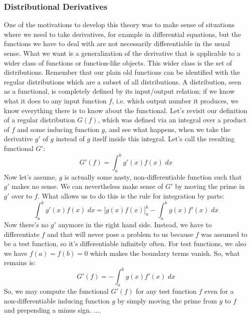 \subsubsection{Distributional Derivatives}
One of the motivations to develop this theory was to make sense of situations where we need to take derivatives, for example in differential equations, but the functions we have to deal with are not necessarily differentiable in the usual sense. What we want is a generalization of the derivative that is applicable to a wider class of functions or function-like objects. This wider class is the set of distributions. Remember that our plain old functions can be identified with the regular distributions which are a subset of all distributions. A distribution, seen as a functional, is completely defined by its input/output relation: if we know what it does to any input function $f$, i.e. which output number it produces, we know everything there is to know about the functional. Let's revisit our definition of a regular distribution $G(f)$, which was defined via an integral over a product of $f$ and some inducing function $g$, and see what happens, when we take the derivative $g'$ of $g$ instead of $g$ itself inside this integral. Let's call the resulting functional $G'$:
\begin{equation}
 G'(f) = \int_a^b g'(x) f(x) \; dx
\end{equation}
Now let's assume, $g$ is actually some nasty, non-differentiable function such that $g'$ makes no sense. We can nevertheless make sense of $G'$ by moving the prime in $g'$ over to $f$. What allows us to do this is the rule for integration by parts:
\begin{equation}
 \int_a^b g'(x) f(x) \; dx = \Big[g(x) f(x)\Big]_a^b - \int_a^b g(x) f'(x) \; dx
\end{equation}
Now there's no $g'$ anymore in the right hand side. Instead, we have to differentiate $f$ and that will never pose a problem to us because $f$ was assumed to be a test function, so it's differentiable infinitely often. For test functions, we also we have $f(a) = f(b) = 0$ which makes the boundary terms vanish. So, what remains is:
\begin{equation}
 G'(f) = - \int_a^b g(x) f'(x) \; dx
\end{equation}
So, we may compute the functional $G'(f)$ for any test function $f$ even for a non-differentiable inducing function $g$ by simply moving the prime from $g$ to $f$ and prepending a minus sign. ....

